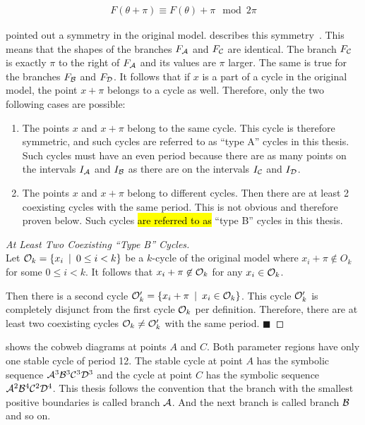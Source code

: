 \begin{align}
	F(\theta + \pi) \equiv F(\theta) + \pi \mod 2\pi \label{equ:state.og.sym}
\end{align}

 pointed out a symmetry in the original model.
 describes this symmetry~\cite{akyuz2022}.
This means that the shapes of the branches $F_{\mathcal{A}}$ and $F_{\mathcal{C}}$ are identical.
The branch $F_{\mathcal{C}}$ is exactly $\pi$ to the right of $F_{\mathcal{A}}$ and its values are $\pi$ larger.
The same is true for the branches $F_{\mathcal{B}}$ and $F_{\mathcal{D}}$.
It follows that if $x$ is a part of a cycle in the original model, the point $x + \pi$ belongs to a cycle as well.
Therefore, only the two following cases are possible:

\begin{enumerate}[label=(\Alph*)]
	\item The points $x$ and $x + \pi$ belong to the same cycle.
	      This cycle is therefore symmetric, and such cycles are referred to as ``type A'' cycles in this thesis.
	      Such cycles must have an even period because there are as many points on the intervals $I_{\mathcal{A}}$ and $I_{\mathcal{B}}$ as there are on the intervals $I_{\mathcal{C}}$ and $I_{\mathcal{D}}$.
	\item The points $x$ and $x + \pi$ belong to different cycles.
	      Then there are at least 2 coexisting cycles with the same period.
	      This is not obvious and therefore proven below.
	      Such cycles \hl {are referred to as} ``type B'' cycles in this thesis.
\end{enumerate}

\begin{proof}[At Least Two Coexisting ``Type B'' Cycles] \phantom{x} \\
	Let $\mathcal{O}_k = \left\{x_i \:\mid\: 0 \leq i < k\right\}$ be a $k$-cycle of the original model where $x_i + \pi \not\in O_k$ for some $0 \leq i < k$.
	It follows that $x_i + \pi \not\in \mathcal{O}_k$ for any $x_i \in \mathcal{O}_k$.

	Then there is a second cycle $\mathcal{O}'_k = \left\{x_i + \pi \:\mid\: x_i \in \mathcal{O}_k\right\}$.
	This cycle $\mathcal{O}'_k$ is completely disjunct from the first cycle $\mathcal{O}_k$ per definition.
	Therefore, there are at least two coexisting cycles $\mathcal{O}_k \neq \mathcal{O}'_k$ with the same period. \hfill	$\blacksquare$
\end{proof}

 shows the cobweb diagrams at points $A$ and $C$.
Both parameter regions have only one stable cycle of period 12.
The stable cycle at point $A$ has the symbolic sequence $\mathcal{A}^3\mathcal{B}^3\mathcal{C}^3\mathcal{D}^3$ and the cycle at point $C$ has the symbolic sequence $\mathcal{A}^2\mathcal{B}^4\mathcal{C}^2\mathcal{D}^4$.
This thesis follows the convention that the branch with the smallest positive boundaries is called branch $\mathcal{A}$.
And the next branch is called branch $\mathcal{B}$ and so on.

